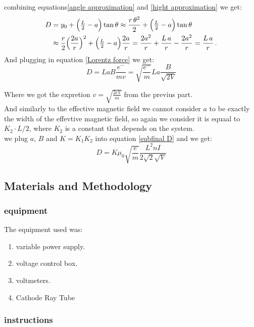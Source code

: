 \documentclass[12pt]{article}
\begin{document}
combining equations\eqref{angle approximation} and \eqref{hight approximation} we get:
\begin{align*}
    D &= y_0 + \Bigl(\tfrac{L}{2} - a\Bigr)\tan\theta
    \approx \frac{r\,\theta^2}{2} + \Bigl(\tfrac{L}{2} - a\Bigr)\tan\theta \\
    &\approx \frac{r}{2}\Bigl(\frac{2a}{r}\Bigr)^2
       + \Bigl(\tfrac{L}{2} - a\Bigr)\frac{2a}{r}
    = \frac{2a^2}{r} + \frac{L\,a}{r} - \frac{2a^2}{r}
    = \frac{L\,a}{r}\,.
    \end{align*}
And plugging in equation \eqref{Lorentz force} we get:
\begin{equation} \label{subfinal D}
    D = L a B \frac{e^-}{mv} = \sqrt{\frac{e^-}{m}}La \frac{B}{\sqrt{2V}}
\end{equation}

Where we got the expretion $v = \sqrt{\frac{2eV}{m}}$ from the previus part.\\

And similarly to the effective magnetic field we cannot consider $a$ to be exactly the width of the effevtive magnetic field, so again we consider it is equaal to $K_2 \cdot L/2 $, where $K_2$ is a constant that depends on the system.\\
we plug $a$, $B$ and $K = K_1 K_2$ into equation \eqref{subfinal D} and we get: 
\begin{equation}
    D = K \mu_0 \sqrt{\frac e m} \frac{L^2 n I}{2\sqrt{2}\sqrt{V}}
\end{equation}

\pagebreak
\subsection{Materials and Methodology}

\subsubsection{equipment}

The equipment used was: 
\begin{enumerate}
    \item variable power supply. 
    \item voltage control box. 
    \item voltmeters. 
    \item Cathode Ray Tube 
\end{enumerate}

\subsubsection{instructions}
\end{document}
